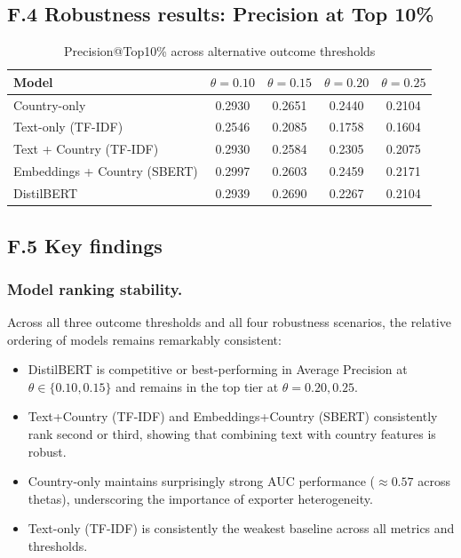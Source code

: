 \documentclass[11pt,a4paper]{article}
\begin{document}
\subsection*{F.4 Robustness results: Precision at Top 10\%}
\begin{table}[H]
\centering
\caption{Precision@Top10\% across alternative outcome thresholds}
\label{tab:p10-theta}
\begin{tabular}{lcccc}
\toprule
Model & $\theta=0.10$ & $\theta=0.15$ & $\theta=0.20$ & $\theta=0.25$ \\
\midrule
Country-only & 0.2930 & 0.2651 & 0.2440 & 0.2104 \\
Text-only (TF-IDF) & 0.2546 & 0.2085 & 0.1758 & 0.1604 \\
Text + Country (TF-IDF) & 0.2930 & 0.2584 & 0.2305 & 0.2075 \\
Embeddings + Country (SBERT) & 0.2997 & 0.2603 & 0.2459 & 0.2171 \\
DistilBERT & 0.2939 & 0.2690 & 0.2267 & 0.2104 \\
\bottomrule
\end{tabular}
\end{table}

\subsection*{F.5 Key findings}

\subsubsection*{Model ranking stability.}
Across all three outcome thresholds and all four robustness scenarios, the relative ordering of models remains remarkably consistent:
\begin{itemize}
  \item DistilBERT is competitive or best-performing in Average Precision at $\theta \in \{0.10, 0.15\}$ and remains in the top tier at $\theta=0.20, 0.25$.
  \item Text+Country (TF-IDF) and Embeddings+Country (SBERT) consistently rank second or third, showing that combining text with country features is robust.
  \item Country-only maintains surprisingly strong AUC performance ($\approx 0.57$ across thetas), underscoring the importance of exporter heterogeneity.
  \item Text-only (TF-IDF) is consistently the weakest baseline across all metrics and thresholds.
\end{itemize}
\end{document}
